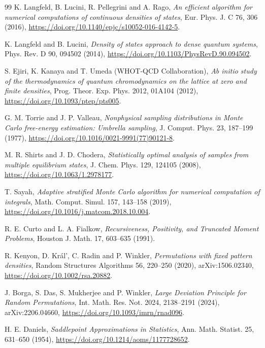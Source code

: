 \documentclass[11pt,a4paper]{article}
\begin{document}
\begin{thebibliography}{99}
K. Langfeld, B. Lucini, R. Pellegrini and A. Rago,
\textit{An efficient algorithm for numerical computations of continuous densities of states},
Eur. Phys. J. C 76, 306 (2016),
\url{https://doi.org/10.1140/epjc/s10052-016-4142-5}.

K. Langfeld and B. Lucini,
\textit{Density of states approach to dense quantum systems},
Phys. Rev. D 90, 094502 (2014),
\url{https://doi.org/10.1103/PhysRevD.90.094502}.

S. Ejiri, K. Kanaya and T. Umeda (WHOT-QCD Collaboration),
\textit{Ab initio study of the thermodynamics of quantum chromodynamics on the lattice at zero and finite densities},
Prog. Theor. Exp. Phys. 2012, 01A104 (2012),
\url{https://doi.org/10.1093/ptep/pts005}.


G. M. Torrie and J. P. Valleau,
\textit{Nonphysical sampling distributions in Monte Carlo free-energy estimation: Umbrella sampling},
J. Comput. Phys. 23, 187--199 (1977),
\url{https://doi.org/10.1016/0021-9991(77)90121-8}.

M. R. Shirts and J. D. Chodera,
\textit{Statistically optimal analysis of samples from multiple equilibrium states},
J. Chem. Phys. 129, 124105 (2008),
\url{https://doi.org/10.1063/1.2978177}.

T. Sayah,
\textit{Adaptive stratified Monte Carlo algorithm for numerical computation of integrals},
Math. Comput. Simul. 157, 143--158 (2019),
\url{https://doi.org/10.1016/j.matcom.2018.10.004}.


R. E. Curto and L. A. Fialkow,
\textit{Recursiveness, Positivity, and Truncated Moment Problems},
Houston J. Math. 17, 603--635 (1991).

R. Kenyon, D. Kr\'al', C. Radin and P. Winkler,
\textit{Permutations with fixed pattern densities},
Random Structures Algorithms 56, 220--250 (2020),
arXiv:1506.02340,
\url{https://doi.org/10.1002/rsa.20882}.

J. Borga, S. Das, S. Mukherjee and P. Winkler,
\textit{Large Deviation Principle for Random Permutations},
Int. Math. Res. Not. 2024, 2138--2191 (2024),
arXiv:2206.04660,
\url{https://doi.org/10.1093/imrn/rnad096}.

H. E. Daniels,
\textit{Saddlepoint Approximations in Statistics},
Ann. Math. Statist. 25, 631--650 (1954),
\url{https://doi.org/10.1214/aoms/1177728652}.


\end{thebibliography}
\end{document}
